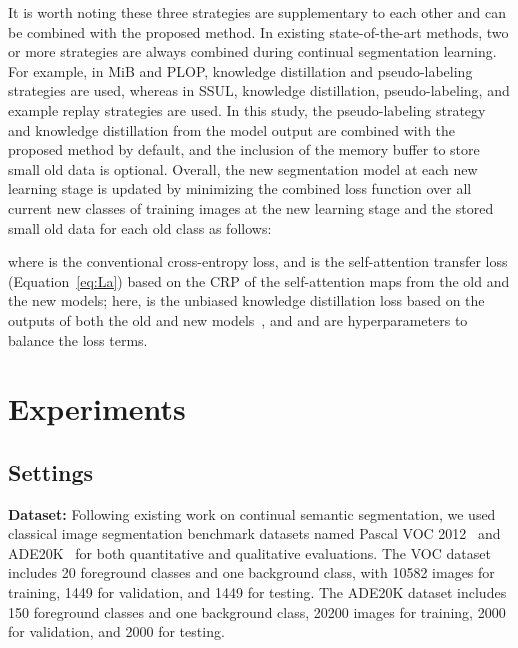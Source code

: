 \documentclass[onecolumn,conference,compsoc]{IEEEtran}
\begin{document}
\begin{spacing}{1.5}
It is worth noting these three strategies are supplementary to each other and can be combined with the proposed method. In existing state-of-the-art methods, two or more strategies {are always combined} during continual segmentation learning. For example, in MiB and PLOP, knowledge distillation and pseudo-labeling strategies {are used, whereas in} SSUL, knowledge distillation, pseudo-labeling, and example replay strategies are used. In this study, the pseudo-labeling strategy and knowledge distillation from the model output are combined with the proposed method by default, and the inclusion of the memory buffer to store small old data is optional. Overall, the new segmentation model at each new learning stage is updated by minimizing the combined loss function  over all current new classes of training images at the new learning stage and the stored small old data for each old class {as follows:}



\noindent where  is the conventional cross-entropy loss, and  is the self-attention transfer loss (Equation~\ref{eq:La}) based on the CRP of the self-attention maps from the old and the new models; here,  is the unbiased knowledge distillation loss based on the outputs of both the old and new models~\cite{MiB}, and  and  are {hyperparameters} to balance the loss terms. 

\section{Experiments}\label{sec:experiments}


\subsection{Settings}
\noindent \textbf{Dataset:}  Following existing work on continual semantic segmentation, we used classical image segmentation benchmark {datasets named} Pascal VOC 2012~\cite{VOC} and ADE20K~\cite{ADE20K} for both quantitative and qualitative evaluations. The VOC dataset includes 20 foreground classes and one background class, with 10582 images for training, 1449 for validation, and 1449 for testing. The ADE20K dataset includes 150 foreground classes and one background class, 20200 images for training, 2000 for validation, and 2000 for testing.


\end{spacing}
\end{document}
